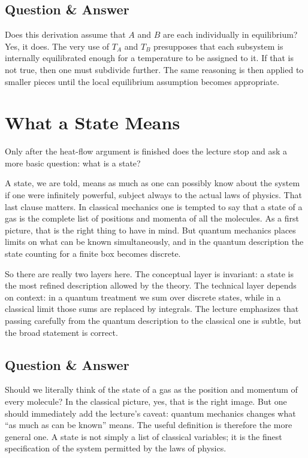 \subsection{Question \& Answer}

Does this derivation assume that \(A\) and \(B\) are each individually in equilibrium? Yes, it does. The very use of \(T_A\) and \(T_B\) presupposes that each subsystem is internally equilibrated enough for a temperature to be assigned to it. If that is not true, then one must subdivide further. The same reasoning is then applied to smaller pieces until the local equilibrium assumption becomes appropriate.

\section{What a State Means}

Only after the heat-flow argument is finished does the lecture stop and ask a more basic question: what is a state?

A state, we are told, means as much as one can possibly know about the system if one were infinitely powerful, subject always to the actual laws of physics. That last clause matters. In classical mechanics one is tempted to say that a state of a gas is the complete list of positions and momenta of all the molecules. As a first picture, that is the right thing to have in mind. But quantum mechanics places limits on what can be known simultaneously, and in the quantum description the state counting for a finite box becomes discrete.

So there are really two layers here. The conceptual layer is invariant: a state is the most refined description allowed by the theory. The technical layer depends on context: in a quantum treatment we sum over discrete states, while in a classical limit those sums are replaced by integrals. The lecture emphasizes that passing carefully from the quantum description to the classical one is subtle, but the broad statement is correct.

\subsection{Question \& Answer}

Should we literally think of the state of a gas as the position and momentum of every molecule? In the classical picture, yes, that is the right image. But one should immediately add the lecture's caveat: quantum mechanics changes what ``as much as can be known'' means. The useful definition is therefore the more general one. A state is not simply a list of classical variables; it is the finest specification of the system permitted by the laws of physics.

